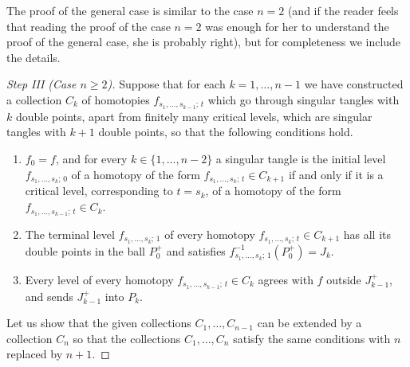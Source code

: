 \documentclass[a4paper,12pt,reqno,oneside]{amsart} %
\theoremstyle{plain}
\theoremstyle{definition}
\theoremstyle{named}
\renewcommand{\:}{\colon}
\begin{document}
The proof of the general case is similar to the case $n=2$ (and if the reader feels that reading the proof of the case $n=2$ 
was enough for her to understand the proof of the general case, she is probably right), but for completeness we include the details.

\begin{proof}[Step III (Case $n\ge 2$)]
Suppose that for each $k=1,\dots,n-1$ we have constructed a collection $C_k$ of homotopies $f_{s_1,\dots,s_{k-1};\,t}$ 
which go through singular tangles with $k$ double points, apart from finitely many critical levels, which are singular
tangles with $k+1$ double points, so that the following conditions hold.
\begin{enumerate}
\item $f_0=f$, and for every $k\in\{1,\dots,n-2\}$ a singular tangle is the initial level $f_{s_1,\dots,s_k;\,0}$
of a homotopy of the form $f_{s_1,\dots,s_k;\,t}\in C_{k+1}$ if and only if it is a critical
level, corresponding to $t=s_k$, of a homotopy of the form $f_{s_1,\dots,s_{k-1};\,t}\in C_k$. 
\item The terminal level $f_{s_1,\dots,s_k;\,1}$ of every homotopy $f_{s_1,\dots,s_k;\,t}\in C_{k+1}$
has all its double points in the ball $P_0^+$ and satisfies $f_{s_1,\dots,s_k;\,1}^{-1}(P_0^+)=J_k$.
\item Every level of every homotopy $f_{s_1,\dots,s_{k-1};\,t}\in C_k$ agrees with $f$ outside $J_{k-1}^+$, 
and sends $J_{k-1}^+$ into $P_k$.
\end{enumerate}
Let us show that the given collections $C_1,\dots,C_{n-1}$ can be extended by a collection $C_n$ so that
the collections $C_1,\dots,C_n$ satisfy the same conditions with $n$ replaced by $n+1$.
 

\end{proof}
\end{document}

